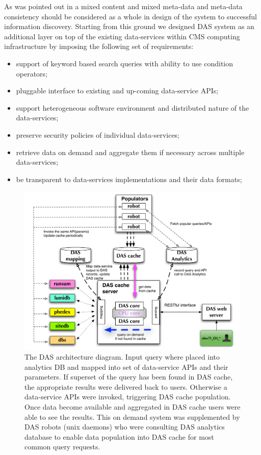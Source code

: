 \documentclass[a4paper]{jpconf}
\begin{document}
As was pointed out in \cite{Arms} a mixed content and 
mixed meta-data and meta-data consistency should be considered as a whole in design 
of the system to successful information discovery. 
Starting from this ground we designed DAS system as an
additional layer on top of the existing data-services
within CMS computing infrastructure by imposing the following set of requirements:
\begin{itemize}
\item support of keyword based search queries with ability to use condition operators;
\item pluggable interface to existing and up-coming data-service APIs;
\item support heterogeneous software environment and distributed nature of the data-services;
\item preserve security policies of individual data-services;
\item retrieve data on demand and aggregate them if necessary across
multiple data-services;
\item be transparent to data-services implementations and their data formats;
\end{itemize}
\begin{figure}[htb]
\centering
\includegraphics[width=150mm]{DAS_Cache_and_Analytics.pdf}
\caption{
The DAS architecture diagram. 
Input query where placed into analytics DB and mapped into set of
data-service APIs and their parameters. If superset of the query has been
found in DAS cache, the appropriate results were delivered back to users.
Otherwise a data-service APIs were invoked, triggering DAS cache population. 
Once data become available and aggregated in DAS cache users were able 
to see the results. This on demand system was supplemented by DAS robots 
(unix daemons) who were consulting DAS analytics database to enable data 
population into DAS cache for most common query requests.
}
\label{DAS_cache}
\end{figure}
\end{document}
